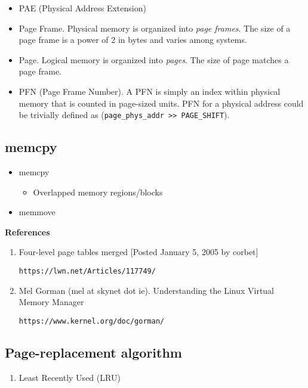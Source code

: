 \documentclass[12pt,a4paper]{article}
\begin{document}
\begin{itemize}
\item PAE (Physical Address Extension)
\item Page Frame.  Physical memory is organized into \emph{page frames}.  The 
size of a page frame is a power of 2 in bytes and varies among systems.
\item Page.  Logical memory is organized into \emph{pages}. The size of page 
matches a page frame.
\item PFN (Page Frame Number).  A PFN is simply an index within physical memory 
that is counted in page-sized units. PFN for a physical address could be 
trivially defined as (\verb"page_phys_addr >> PAGE_SHIFT").
\end{itemize}

\subsection{memcpy}

\begin{itemize}
\item memcpy

	\begin{itemize}
	\item Overlapped memory regions/blocks
	\end{itemize}

\item memmove
\end{itemize}

\textbf{References}

\begin{enumerate}
\item Four-level page tables merged [Posted January 5, 2005 by corbet]

	\texttt{https://lwn.net/Articles/117749/}

\item Mel Gorman (mel at skynet dot ie).  Understanding the Linux Virtual Memory Manager

	\texttt{https://www.kernel.org/doc/gorman/}
\end{enumerate}

\subsection{Page-replacement algorithm}

\begin{enumerate}

\item Least Recently Used (LRU)

\end{enumerate}
\end{document}
